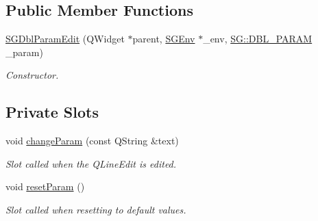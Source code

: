 \subsection*{Public Member Functions}
\begin{DoxyCompactItemize}
\item 
\mbox{\label{classSGDblParamEdit_a04a6ff29f1494c926f07b34ca44ae75f}} 
\hyperlink{classSGDblParamEdit_a04a6ff29f1494c926f07b34ca44ae75f}{S\+G\+Dbl\+Param\+Edit} (Q\+Widget $\ast$parent, \hyperlink{classSGEnv}{S\+G\+Env} $\ast$\+\_\+env, \hyperlink{namespaceSG_ac2f86c953fcec4419ac86538d9d314b6}{S\+G\+::\+D\+B\+L\+\_\+\+P\+A\+R\+AM} \+\_\+param)
\begin{DoxyCompactList}\small\item\em Constructor. \end{DoxyCompactList}\end{DoxyCompactItemize}
\subsection*{Private Slots}
\begin{DoxyCompactItemize}
\item 
\mbox{\label{classSGDblParamEdit_a1997b404f0484433f980c75e54c62e50}} 
void \hyperlink{classSGDblParamEdit_a1997b404f0484433f980c75e54c62e50}{change\+Param} (const Q\+String \&text)
\begin{DoxyCompactList}\small\item\em Slot called when the Q\+Line\+Edit is edited. \end{DoxyCompactList}\item 
\mbox{\label{classSGDblParamEdit_a24f02d2e85467dd0883fbb055b3f00e1}} 
void \hyperlink{classSGDblParamEdit_a24f02d2e85467dd0883fbb055b3f00e1}{reset\+Param} ()
\begin{DoxyCompactList}\small\item\em Slot called when resetting to default values. \end{DoxyCompactList}\end{DoxyCompactItemize}

